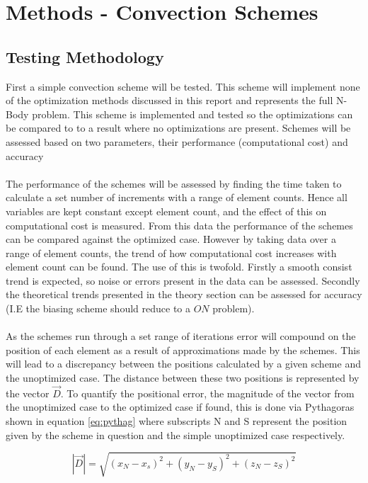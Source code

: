 \section{Methods - Convection Schemes}
\subsection{Testing Methodology}
First a simple convection scheme will be tested. This scheme will implement none of the optimization methods discussed in this report and represents the full N-Body problem. This scheme is implemented and tested so the optimizations can be compared to to a result where no optimizations are present. Schemes will be assessed based on two parameters, their performance (computational cost) and accuracy
\\\\
The performance of the schemes will be assessed by finding the time taken to calculate a set number of increments with a range of element counts. Hence all variables are kept constant except element count, and the effect of this on computational cost is measured. From this data the performance of the schemes can be compared against the optimized case. However by taking data over a range of element counts, the trend of how computational cost increases with element count can be found. The use of this is twofold. Firstly a smooth consist trend is expected, so noise or errors present in the data can be assessed. Secondly the theoretical trends presented in the theory section can be assessed for accuracy (I.E the biasing scheme should reduce to a $ON$ problem).
\\\\
As the schemes run through a set range of iterations error will compound on the position of each element as a result of approximations made by the schemes. This will lead to a discrepancy between the positions calculated by a given scheme and the unoptimized case. The distance between these two positions is represented by the vector $\vec{D}$. To quantify the positional error, the magnitude of the vector from the unoptimized case to the optimized case if found, this is done via Pythagoras shown in equation \ref{eq:pythag} where subscripts N and S represent the position given by the scheme in question and the simple unoptimized case respectively.

\begin{equation}
\label{eq:pythag}
|\vec{D}|=\sqrt{(x_N-x_s)^2+(y_N-y_S)^2+(z_N-z_S)^2}
\end{equation}

